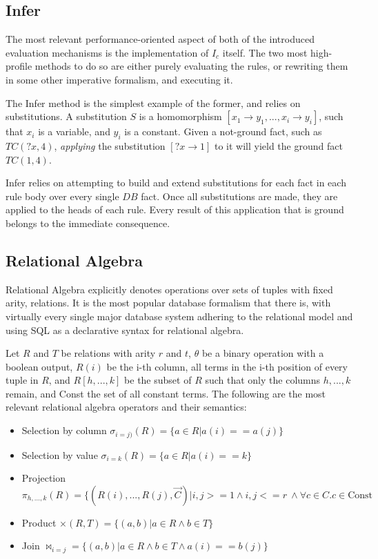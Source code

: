 \documentclass[manuscript,screen,review]{acmart}
\theoremstyle{definition}
\begin{document}
\subsection{Infer}
The most relevant performance-oriented aspect of both of the introduced evaluation mechanisms is the implementation of $I_c$ itself. The two
most high-profile methods to do so are either purely evaluating the rules, or rewriting them in some other imperative formalism, and executing it.

The Infer\cite{datalog} method is the simplest example of the former, and relies on substitutions. A substitution $S$ is a homomorphism
$[x_1 \rightarrow y_1, ..., x_i \rightarrow y_i]$, such that $x_i$ is a variable, and $y_i$ is a constant. Given a not-ground fact,
such as $TC(?x, 4)$, \textit{applying} the substitution $[?x \rightarrow 1]$ to it will yield the ground fact $TC(1, 4)$.

Infer relies on attempting to build and extend substitutions for each fact in each rule body over every single $DB$ fact. Once
all substitutions are made, they are applied to the heads of each rule. Every result of this application that is ground belongs
to the immediate consequence.

\subsection{Relational Algebra}
Relational Algebra\cite{codd_1970} explicitly denotes operations over sets of tuples with fixed arity, relations. It is
the most popular database formalism that there is, with virtually every single major database system adhering to the relational model\cite{pg,mysql,sqlserver}
and using SQL as a declarative syntax for relational algebra.

Let $R$ and $T$ be relations with arity $r$ and $t$, $\theta$ be a binary operation with a boolean output, $R(i)$ be the i-th column, all terms in the i-th position of every tuple in $R$, and
$R[h, ..., k]$ be the subset of $R$ such that only the columns $h, ..., k$ remain, and Const the set of all constant terms. The following
are the most relevant relational algebra operators and their semantics:
\begin{itemize}
	\item Selection by column $\sigma_{i=j)}(R) = \{ a \in R | a(i) == a(j) \}$
	\item Selection by value $\sigma_{i=k}(R) = \{a \in R | a(i) == k \}$
	\item Projection $\pi_{h, ..., k}(R) = \{(R(i), ..., R(j), \overrightarrow{C}) |  i, j >= 1 \wedge i, j <= r\ \wedge \forall c \in C. c \in \text{Const}$
	\item Product $\times(R, T) = \{(a, b) | a \in R \wedge b \in T \}$
	\item Join $\Join_{i=j} = \{(a, b) | a \in R \wedge b \in T \wedge a(i) == b(j)\}$
\end{itemize}
\end{document}
